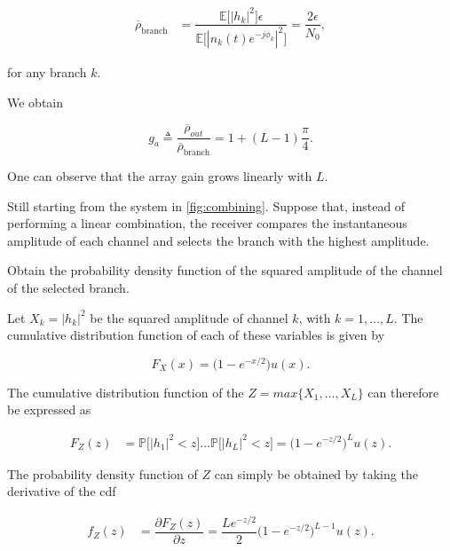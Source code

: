 \documentclass [a4paper, 11pt] {article}
\begin{document}
\begin{solution}
\begin{enumerate}
    \begin{align}
    \overline{\rho}_{\text{branch}} &= \dfrac{\mathbb{E}\bigg[ |h_k|^2 \bigg] \epsilon}{\mathbb{E}\Big[ |n_k(t)e^{-j\phi_k}|^2\Big]} = \dfrac{2\epsilon}{N_0},
    \end{align}

    for any branch $k$.

    We obtain

    \begin{equation}
    g_a \triangleq \frac{\overline{\rho}_{out}}{\overline{\rho}_{\text{branch}}} = 1 + (L-1)\dfrac{\pi}{4}.
    \end{equation}

    One can observe that the array gain grows linearly with $L$.
\end{enumerate}


    \end{solution}


    \begin{exercise}{3}
    Still starting from the system in \autoref{fig:combining}. Suppose that, instead of performing a linear combination, the receiver compares the instantaneous amplitude of each channel and selects the branch with the highest amplitude.

    Obtain the probability density function of the squared amplitude of the channel of the selected branch.
    \end{exercise}

    \begin{solution}

        Let $X_k = |h_k|^2$ be the squared amplitude of channel $k$, with $k=1,\hdots,L$.
The cumulative distribution function of each of these variables is given by

    \begin{equation}
        F_X(x) = \big(1 - e^{-x/2}\big)u(x).
        \end{equation}

 The cumulative distribution function of the $Z = max\{X_1, \hdots, X_L \}$ can therefore be expressed as

\begin{align}
    F_Z(z)&= \mathbb{P}\Big[|h_1|^2 < z \Big] \hdots \mathbb{P}\Big[|h_L|^2 < z \Big] = \Big(1 - e^{-z/2} \Big)^L u(z).
\end{align}

The probability density function of $Z$ can simply be obtained by taking the derivative of the cdf

\begin{align}
    f_Z(z)&= \dfrac{\partial F_Z(z)}{\partial z} = \dfrac{Le^{-z/2}}{2} \Big(1 - e^{-z/2} \Big)^{L-1} u(z).
\end{align}


    \end{solution}
\end{document}
